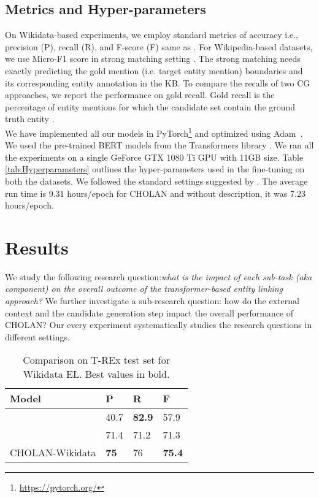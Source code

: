 \documentclass[11pt,a4paper]{article}
\begin{document}
\subsection{Metrics and Hyper-parameters}
On Wikidata-based experiments, we employ standard metrics of accuracy i.e., precision (P), recall (R), and F-score (F) same as \cite{Mulang2019ContextawareEL}. For Wikipedia-based datasets, we use Micro-F1 score in strong matching setting \cite{kolitsas2018end}. The strong matching needs exactly predicting the gold mention (i.e. target entity mention) 
boundaries and its corresponding entity annotation in the KB. To compare the recalls of two CG approaches, we report the performance on gold recall. Gold recall is the percentage of entity mentions for which the candidate set contain the ground truth entity \cite{yao2019kg}. \\
We have implemented all our models in PyTorch\footnote{\url{https://pytorch.org/}} and optimized using Adam~\cite{DBLP:journals/corr/KingmaB14}. We used the pre-trained BERT models from the Transformers library \cite{Wolf2019HuggingFacesTS}. We ran all the experiments on a single GeForce GTX 1080 Ti GPU with 11GB size.
Table \ref{tab:Hyperparameters} outlines the hyper-parameters used in the fine-tuning on both the datasets. We followed the standard settings suggested by \cite{devlin2019bert}. The average run time is 9.31 hours/epoch for CHOLAN and without description, it was 7.23 hours/epoch.








\section{Results}\label{sec:results}
We study the following research question:\textit{what is the impact of each sub-task (aka component) on the overall outcome of the transformer-based entity linking approach?} We further investigate a sub-research question: how do the external context and the candidate generation step impact the overall performance of CHOLAN?
Our every experiment systematically studies the research questions in different settings. 

\begin{table}[!htp]
    \centering
    \begin{tabular}{p{3cm}p{0.65cm}p{0.7cm}p{0.65cm} }
     
\toprule
\textbf{Model} & \textbf{P} & \textbf{R} & \textbf{F}\\
\midrule
      \citealt{delpeuch2019opentapioca}  & 40.7    &\textbf{82.9} &57.9\\
      \citealt{Mulang2019ContextawareEL}  & 71.4    &71.2 &71.3\\
\midrule
     CHOLAN-Wikidata &  \textbf{75}  & 76 &\textbf{75.4}\\
\bottomrule
    \end{tabular}
    \caption{Comparison on T-REx test set for Wikidata EL. Best values in bold.}
    \label{tab:trex}
    \vspace{-2mm}
\end{table}
\end{document}

